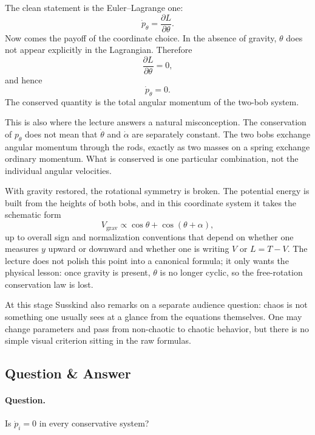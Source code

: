 The clean statement is the Euler--Lagrange one:
\begin{equation}
\dot p_\theta=\frac{\partial L}{\partial \theta}.
\end{equation}
Now comes the payoff of the coordinate choice. In the absence of gravity, \(\theta\) does not appear explicitly in the Lagrangian. Therefore
\begin{equation}
\frac{\partial L}{\partial \theta}=0,
\end{equation}
and hence
\begin{equation}
\dot p_\theta=0.
\end{equation}
The conserved quantity is the total angular momentum of the two-bob system.

This is also where the lecture answers a natural misconception. The conservation of \(p_\theta\) does not mean that \(\dot\theta\) and \(\dot\alpha\) are separately constant. The two bobs exchange angular momentum through the rods, exactly as two masses on a spring exchange ordinary momentum. What is conserved is one particular combination, not the individual angular velocities.

With gravity restored, the rotational symmetry is broken. The potential energy is built from the heights of both bobs, and in this coordinate system it takes the schematic form
\begin{equation}
V_{\text{grav}}\propto \cos\theta+\cos(\theta+\alpha),
\end{equation}
up to overall sign and normalization conventions that depend on whether one measures \(y\) upward or downward and whether one is writing \(V\) or \(L=T-V\). The lecture does not polish this point into a canonical formula; it only wants the physical lesson: once gravity is present, \(\theta\) is no longer cyclic, so the free-rotation conservation law is lost.

At this stage Susskind also remarks on a separate audience question: chaos is not something one usually sees at a glance from the equations themselves. One may change parameters and pass from non-chaotic to chaotic behavior, but there is no simple visual criterion sitting in the raw formulas.

\subsection{Question \& Answer}

\paragraph{Question.} Is \(\dot p_i=0\) in every conservative system?

